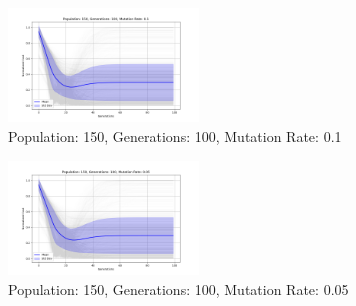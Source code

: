 \documentclass[
]{article}
\begin{document}
    \begin{figure}[H]
        \centering
        \includegraphics[width=0.45\textwidth]{genetic_algorithm/appendix/Population_150_Generations_100_MutationRate_0.1}
        \caption{Population: 150, Generations: 100, Mutation Rate: 0.1}
        \label{fig:app_ga_150_100_1}
    \end{figure}

    \begin{figure}[H]
        \centering
        \includegraphics[width=0.45\textwidth]{genetic_algorithm/appendix/Population_150_Generations_100_MutationRate_0.05}
        \caption{Population: 150, Generations: 100, Mutation Rate: 0.05}
        \label{fig:app_ga_150_100_05}
    \end{figure}
\end{document}
